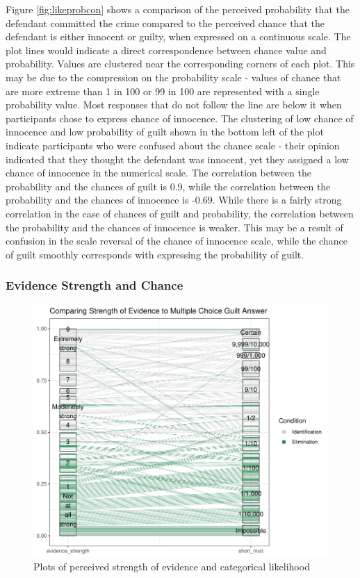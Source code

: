 \documentclass[print]{nuthesis}
\begin{document}
Figure \ref{fig:likeprobcon} shows a comparison of the perceived probability that the defendant committed the crime compared to the perceived chance that the defendant is either innocent or guilty, when expressed on a continuous scale.
The plot lines would indicate a direct correspondence between chance value and probability.
Values are clustered near the corresponding corners of each plot.
This may be due to the compression on the probability scale - values of chance that are more extreme than 1 in 100 or 99 in 100 are represented with a single probability value.
Most responses that do not follow the line are below it when participants chose to express chance of innocence.
The clustering of low chance of innocence and low probability of guilt shown in the bottom left of the plot indicate participants who were confused about the chance scale - their opinion indicated that they thought the defendant was innocent, yet they assigned a low chance of innocence in the numerical scale.
The correlation between the probability and the chances of guilt is 0.9,
while the correlation between the probability and the chances of innocence is -0.69.
While there is a fairly strong correlation in the case of chances of guilt and probability, the correlation between the probability and the chances of innocence is weaker.
This may be a result of confusion in the scale reversal of the chance of innocence scale, while the chance of guilt smoothly corresponds with expressing the probability of guilt.

\hypertarget{evidence-strength-and-chance}{%
\subsubsection{Evidence Strength and Chance}\label{evidence-strength-and-chance}}

\begin{figure}

{\centering \includegraphics[width=\linewidth]{thesis_files/figure-latex/coordstrcat-1} 

}

\caption{Plots of perceived strength of evidence and categorical likelihood}\label{fig:coordstrcat}
\end{figure}
\end{document}
